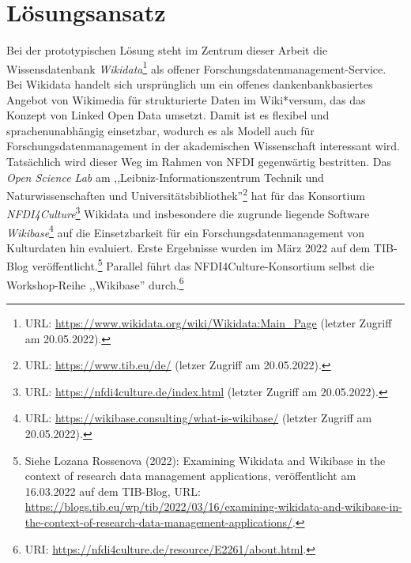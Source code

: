 \onehalfspacing

\section{Lösungsansatz}

Bei der prototypischen Lösung steht im Zentrum dieser Arbeit die Wissensdatenbank \textit{Wikidata}\footnote{URL: \url{https://www.wikidata.org/wiki/Wikidata:Main_Page} (letzter Zugriff am 20.05.2022).} als offener Forschungsdatenmanagement-Service. Bei Wikidata handelt sich ursprünglich um ein offenes dankenbankbasiertes Angebot von Wikimedia für strukturierte Daten im Wiki*versum, das das Konzept von Linked Open Data umsetzt. Damit ist es flexibel und sprachenunabhängig einsetzbar, wodurch es als Modell auch für Forschungsdatenmanagement in der akademischen Wissenschaft interessant wird. Tatsächlich wird dieser Weg im Rahmen von NFDI gegenwärtig bestritten. Das \textit{Open Science Lab} am ,,Leibniz-Informationszentrum Technik und Naturwissenschaften und Universitätsbibliothek''\footnote{URL: \url{https://www.tib.eu/de/} (letzer Zugriff am 20.05.2022).} hat für das Konsortium \textit{NFDI4Culture}\footnote{URL: \url{https://nfdi4culture.de/index.html} (letzter Zugriff am 20.05.2022).} Wikidata und insbesondere die zugrunde liegende Software \textit{Wikibase}\footnote{URL: \url{https://wikibase.consulting/what-is-wikibase/} (letzter Zugriff am 20.05.2022).} auf die Einsetzbarkeit für ein Forschungsdatenmanagement von Kulturdaten hin evaluiert. Erste Ergebnisse wurden im März 2022 auf dem TIB-Blog veröffentlicht.\footnote{Siehe Lozana Rossenova (2022): Examining Wikidata and Wikibase in the context of research data management applications, veröffentlicht am 16.03.2022 auf dem TIB-Blog, URL: \url{https://blogs.tib.eu/wp/tib/2022/03/16/examining-wikidata-and-wikibase-in-the-context-of-research-data-management-applications/}.} Parallel führt das NFDI4Culture-Konsortium selbst die Workshop-Reihe ,,Wikibase'' durch.\footnote{URI: \url{https://nfdi4culture.de/resource/E2261/about.html}.} 

